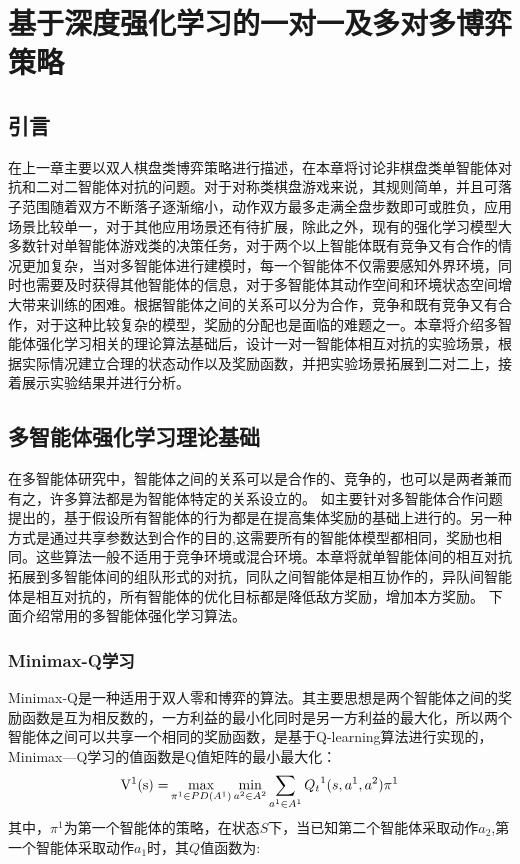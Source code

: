 \chapter{基于深度强化学习的一对一及多对多博弈策略}
\section{引言}
在上一章主要以双人棋盘类博弈策略进行描述，在本章将讨论非棋盘类单智能体对抗和二对二智能体对抗的问题。对于对称类棋盘游戏来说，其规则简单，并且可落子范围随着双方不断落子逐渐缩小，动作双方最多走满全盘步数即可或胜负，应用场景比较单一，对于其他应用场景还有待扩展，除此之外，现有的强化学习模型大多数针对单智能体游戏类的决策任务，对于两个以上智能体既有竞争又有合作的情况更加复杂，当对多智能体进行建模时，每一个智能体不仅需要感知外界环境，同时也需要及时获得其他智能体的信息，对于多智能体其动作空间和环境状态空间增大带来训练的困难。根据智能体之间的关系可以分为合作，竞争和既有竞争又有合作，对于这种比较复杂的模型，奖励的分配也是面临的难题之一。本章将介绍多智能体强化学习相关的理论算法基础后，设计一对一智能体相互对抗的实验场景，根据实际情况建立合理的状态动作以及奖励函数，并把实验场景拓展到二对二上，接着展示实验结果并进行分析。
\section{多智能体强化学习理论基础}
在多智能体研究中，智能体之间的关系可以是合作的、竞争的，也可以是两者兼而有之，许多算法都是为智能体特定的关系设立的。
如\cite{Lazaridou2017Multi}主要针对多智能体合作问题提出的，基于假设所有智能体的行为都是在提高集体奖励的基础上进行的。另一种方式是通过共享参数达到合作的目的\cite{Gupta2017Cooperative},这需要所有的智能体模型都相同，奖励也相同。这些算法一般不适用于竞争环境或混合环境。本章将就单智能体间的相互对抗拓展到多智能体间的组队形式的对抗，同队之间智能体是相互协作的，异队间智能体是相互对抗的，所有智能体的优化目标都是降低敌方奖励，增加本方奖励。
下面介绍常用的多智能体强化学习算法。
\subsection{Minimax-Q学习}
Minimax-Q\cite{Littman1994Markov}是一种适用于双人零和博弈的算法。其主要思想是两个智能体之间的奖励函数是互为相反数的，一方利益的最小化同时是另一方利益的最大化，所以两个智能体之间可以共享一个相同的奖励函数，是基于Q-learning算法进行实现的，Minimax—Q学习的值函数是Q值矩阵的最小最大化：
\begin{equation}
{{\rm{V}}^1}{\rm{(s) = }}\mathop {\max }\limits_{{\pi ^1} \in PD({A^1})} \mathop {\min }\limits_{{a^2} \in {A^2}} \sum\limits_{{a^1} \in {A^1}} {{Q_t}^1(s,{a^1},{a^2})} {\pi ^1}
\end{equation}
其中，${\pi ^1}$为第一个智能体的策略，在状态$S$下，当已知第二个智能体采取动作$a_2$,第一个智能体采取动作$a_1$时，其$Q$值函数为:

